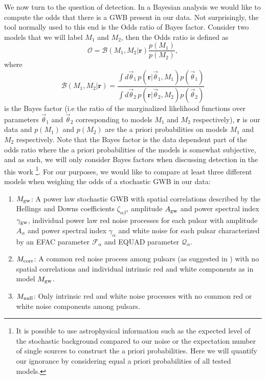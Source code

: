 \documentclass[iop]{emulateapj}
\newcommand{\be}{\begin{equation}}
\newcommand{\ee}{\end{equation}}
\begin{document}
We now turn to the question of detection. In a Bayesian analysis we would like to compute the odds that there is a GWB present in our data. Not surprisingly, the tool normally used to this end is the Odds ratio of Bayes factor. Consider two models that we will label $M_{1}$ and $M_{2}$, then the Odds ratio is defined as
\be
\mathcal{O}=\mathcal{B}(M_{1},M_{2}|\mathbf{r})\frac{p(M_{1})}{p(M_{2})},
\ee
 where
 \be
 \mathcal{B}(M_{1},M_{2}|\mathbf{r})=\frac{\int d\vec\theta_{1}\,p(\mathbf{r}|\vec\theta_{1},M_{1})p(\vec\theta_{1})}{\int d\vec\theta_{2}\,p(\mathbf{r}|\vec\theta_{2},M_{2})p(\vec\theta_{2})}
 \ee
 is the Bayes factor (i.e the ratio of the marginalized likelihood functions over parameters $\vec\theta_{1}$ and $\vec\theta_{2}$ corresponding to models $M_{1}$ and $M_{2}$ respectively), $\mathbf{r}$ is our data and $p(M_{1})$ and $p(M_{2})$ are the a priori probabilities on models $M_{1}$ and $M_{2}$ respectively. Note that the Bayes factor is the data dependent part of the odds ratio where the a priori probabilities of the models is somewhat subjective, and as such, we will only consider Bayes factors when discussing detection in the this work \footnote{It is possible to use astrophysical information such as the expected level of the stochastic background compared to our noise or the expectation number of single sources to construct the a priori probabilities. Here we will quantify our ignorance by considering equal a priori probabilities of all tested models.}. For our purposes, we would like to compare at least three different models when weighing the odds of a stochastic GWB in our data:
 \begin{enumerate}
 
 \item $M_{\rm gw}$: A power law stochastic GWB with spatial correlations described by the Hellings and Downs coefficients $\zeta_{\alpha\beta}$, amplitude $A_{\rm gw}$ and power spectral index $\gamma_{\rm gw}$, individual power law red noise processes for each pulsar with amplitude $A_{\alpha}$ and power spectral index $\gamma_{\alpha}$ and white noise for each pulsar characterized by an EFAC parameter $\mathcal{F}_{\alpha}$ and EQUAD parameter $\mathcal{Q}_{\alpha}$.
 
 \item $M_{\rm corr}$: A common red noise process among pulsars (as suggested in \cite{sc10}) with no spatial correlations and individual intrinsic red and white components as in model $M_{\rm gw}$.
 
 \item $M_{\rm null}$: Only intrinsic red and white noise processes with no common red or white noise components among pulsars.
 
 \end{enumerate}
\end{document}
